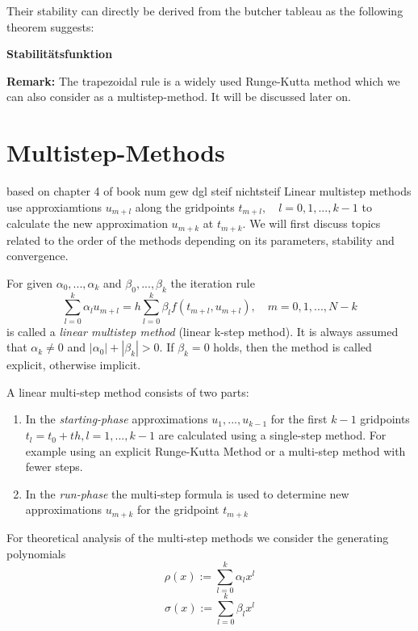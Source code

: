 		Their stability can directly be derived from the butcher tableau as the following theorem suggests:
		
		\textbf{Stabilitätsfunktion}
		
		\textbf{Remark:} The trapezoidal rule is a widely used Runge-Kutta method which we can also consider as a multistep-method. It will be discussed later on.
	
			
\section{Multistep-Methods}
	based on chapter 4 of book num gew dgl steif nichtsteif \newline
	Linear multistep methods use approxiamtions $u_{m+l}$ along the gridpoints $t_{m+l}, \quad l=0,1,...,k-1$ to calculate the new approximation $u_{m+k}$ at $t_{m+k}$. We will first discuss topics related to the order of the methods depending on its parameters, stability and convergence.
	
	\begin{definition}
		For given $\alpha_0, ..., \alpha_k$ and $\beta_0, ..., \beta_k$ the iteration rule
		\begin{equation}
			\label{linear-multistep-method}
			\sum_{l=0}^{k} \alpha_l u_{m+l} = h \sum_{l=0}^{k} \beta_l f(t_{m+l}, u_{m+l}), \quad m=0,1,...,N-k
		\end{equation}
		is called a \emph{linear multistep method} (linear k-step method). It is always assumed that $\alpha_k \neq 0$ and $|\alpha_0| + |\beta_k| > 0$. If $\beta_k=0$ holds, then the method is called explicit, otherwise implicit.
	\end{definition}
	
	A linear multi-step method consists of two parts:
	\begin{enumerate}
		\item In the \emph{starting-phase} approximations $u_1,...,u_{k-1}$ for the first $k-1$ gridpoints $t_l = t_0+th, l=1,...,k-1$ are calculated using a single-step method. For example using an explicit Runge-Kutta Method or a multi-step method with fewer steps.
		
		\item  In the \emph{run-phase} the multi-step formula is used to determine new approximations $u_{m+k}$ for the gridpoint $t_{m+k}$
	\end{enumerate}
	
	For theoretical analysis of the multi-step methods we consider the generating polynomials
	\begin{equation}
		\rho(x) := \sum_{l=0}^{k} \alpha_l x^l
	\end{equation}
	\begin{equation}
		\sigma(x) := \sum_{l=0}^{k} \beta_l x^l
	\end{equation}
	
